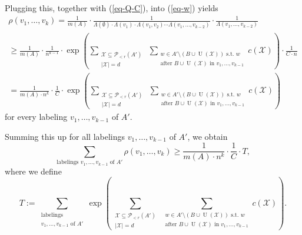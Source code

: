 Plugging this, together with (\ref{eq-Q-C}), into (\ref{eq-w}) yields
\begin{multline*}
\rho(v_1,\dots,v_k)=\frac{1}{m(A)}\cdot \frac{1}{\Lambda(\emptyset)\cdot \Lambda(v_1)\cdot \Lambda(v_1, v_2)\dotsm \Lambda(v_1,\dots,v_{k-2})}\cdot \frac{1}{\Lambda(v_1,\dots,v_{k-2})}\\
\geq \frac{1}{m(A)}\cdot \frac{1}{n^{k-1}}\cdot \exp\left(\sum_{\substack{\mathcal{X}\subseteq \mathcal{P}\!_{<r}(A')\\\vert \mathcal{X}\vert=d}}\ \sum_{\substack{w\in A'\setminus(B\cup \operatorname{U}(\mathcal{X}))\text{ s.t. }w\\\text{after }B\cup \operatorname{U}(\mathcal{X})\text{ in }v_1,\dots,v_{k-1}}}c(\mathcal{X})\right)\cdot \frac{1}{C\cdot n}\\
=\frac{1}{m(A)\cdot n^k}\cdot \frac{1}{C}\cdot \exp\left(\sum_{\substack{\mathcal{X}\subseteq \mathcal{P}\!_{<r}(A')\\\vert \mathcal{X}\vert=d}}\ \sum_{\substack{w\in A'\setminus(B\cup \operatorname{U}(\mathcal{X}))\text{ s.t. }w\\\text{after }B\cup \operatorname{U}(\mathcal{X})\text{ in }v_1,\dots,v_{k-1}}}c(\mathcal{X})\right)
\end{multline*}
for every labeling $v_1,\dots,v_{k-1}$ of $A'$.

Summing this up for all labelings $v_1,\dots,v_{k-1}$ of $A'$, we obtain
\begin{equation}\label{ineq1}
\sum_{\text{labelings }v_1,\dots, v_{k-1}\text{ of } A'}\rho(v_1,\dots,v_k)
\geq \frac{1}{m(A)\cdot n^k}\cdot \frac{1}{C}\cdot T,
\end{equation}
where we define
\[T:=\sum_{\substack{\text{labelings }\\v_1,\dots, v_{k-1}\text{ of } A'}}\exp\left(\sum_{\substack{\mathcal{X}\subseteq \mathcal{P}\!_{<r}(A')\\\vert \mathcal{X}\vert=d}}\ \sum_{\substack{w\in A'\setminus(B\cup \operatorname{U}(\mathcal{X}))\text{ s.t. }w\\\text{after }B\cup \operatorname{U}(\mathcal{X})\text{ in }v_1,\dots,v_{k-1}}}c(\mathcal{X})\right).\]

